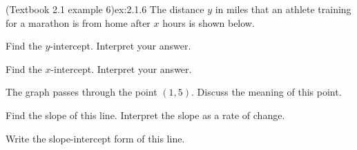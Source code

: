 \documentclass{article}
\begin{document}
\begin{example}{(Textbook 2.1 example 6)}{ex:2.1.6}
    The distance $y$ in miles that an athlete training for a marathon is from home after $x$ hours is shown below.
    
    \begin{minipage}{.35\textwidth}
    \end{minipage}
    \begin{minipage}{.63\textwidth}
        \begin{problem}
            \item Find the $y$-intercept. Interpret your answer.
            \item Find the $x$-intercept. Interpret your answer.
            \item The graph passes through the point $(1,5)$. Discuss the meaning of this point.
            \item Find the slope of this line. Interpret the slope as a rate of change.
            \item Write the slope-intercept form of this line.
        \end{problem}
    \end{minipage}
\end{example}
\end{document}
